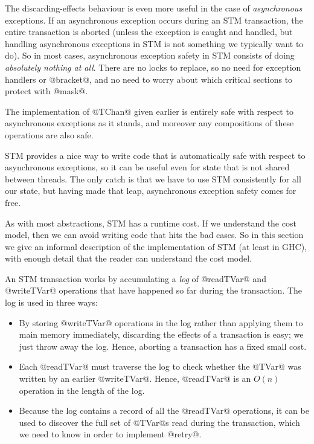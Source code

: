 The discarding-effects behaviour is even more useful in the case of
\emph{asynchronous} exceptions.  If an asynchronous exception occurs
during an STM transaction, the entire transaction is aborted (unless
the exception is caught and handled, but handling asynchronous
exceptions in STM is not something we typically want to do).  So in
most cases, asynchronous exception safety in STM consists of doing
\emph{absolutely nothing at all}.  There are no locks to replace, so
no need for exception handlers or @bracket@, and no need to worry
about which critical sections to protect with @mask@.

The implementation of @TChan@ given earlier is entirely safe with
respect to asynchronous exceptions as it stands, and moreover any
compositions of these operations are also safe.

STM provides a nice way to write code that is automatically safe with
respect to asynchronous exceptions, so it can be useful even for state
that is not shared between threads.  The only catch is that we have to
use STM consistently for all our state, but having made that leap,
asynchronous exception safety comes for free.


As with most abstractions, STM has a runtime cost.  If we understand
the cost model, then we can avoid writing code that hits the bad
cases.  So in this section we give an informal description of the
implementation of STM (at least in GHC), with enough detail that the
reader can understand the cost model.

An STM transaction works by accumulating a \emph{log} of @readTVar@
and @writeTVar@ operations that have happened so far during the
transaction.  The log is used in three ways:

\begin{itemize}
\item By storing @writeTVar@ operations in the log rather than
  applying them to main memory immediately, discarding the effects of
  a transaction is easy; we just throw away the log.  Hence, aborting
  a transaction has a fixed small cost.

\item Each @readTVar@ must traverse the log to check whether the
  @TVar@ was written by an earlier @writeTVar@.  Hence, @readTVar@ is
  an $O(n)$ operation in the length of the log.

\item Because the log contains a record of all the @readTVar@
  operations, it can be used to discover the full set of @TVar@s read
  during the transaction, which we need to know in order to implement
  @retry@.
\end{itemize}

